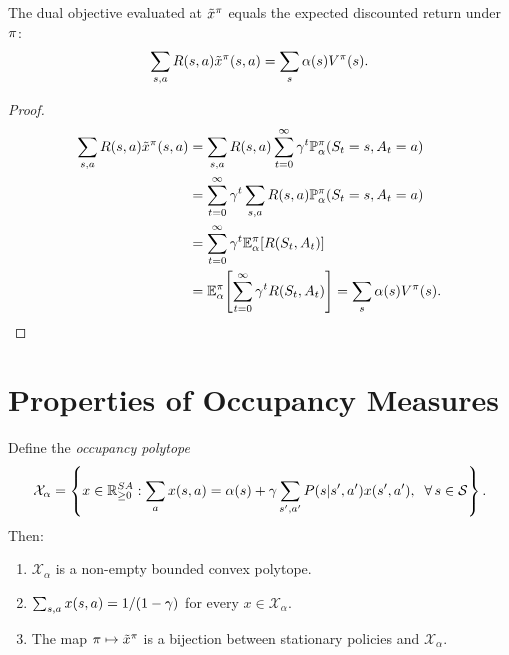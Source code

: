 \documentclass[11pt,a4paper]{article}
\begin{document}
\begin{proposition}
\label{prop:dual-value}
The dual objective evaluated at $\tilde{x}^\pi$ equals the
expected discounted return under $\pi$:
\[
    \sum_{s,a} R(s,a) \tilde{x}^\pi(s,a)
    = \sum_s \alpha(s) V^{\pi}(s).
\]
\end{proposition}

\begin{proof}
\begin{align*}
    \sum_{s,a} R(s,a) \tilde{x}^\pi(s,a)
    &= \sum_{s,a} R(s,a) \sum_{t=0}^\infty \gamma^t
    \mathbb{P}^\pi_\alpha(S_t = s, A_t = a) \\
    &= \sum_{t=0}^\infty \gamma^t \sum_{s,a} R(s,a)
    \mathbb{P}^\pi_\alpha(S_t = s, A_t = a) \\
    &= \sum_{t=0}^\infty \gamma^t
    \mathbb{E}^\pi_\alpha[R(S_t, A_t)] \\
    &= \mathbb{E}^\pi_\alpha\!\left[\sum_{t=0}^\infty
    \gamma^t R(S_t, A_t)\right]
    = \sum_s \alpha(s) V^{\pi}(s). \qedhere
\end{align*}
\end{proof}


\section{Properties of Occupancy Measures}
\label{sec:occupancy-properties}

\begin{theorem}
\label{thm:occupancy-polytope}
Define the \emph{occupancy polytope}
\begin{equation}
\label{eq:occupancy-set}
    \mathcal{X}_\alpha = \left\{ x \in \mathbb{R}^{SA}_{\geq 0} :
    \sum_a x(s,a) = \alpha(s) + \gamma \sum_{s',a'}
    P(s|s',a') x(s',a'), \;\; \forall\, s \in \mathcal{S} \right\}.
\end{equation}
Then:
\begin{enumerate}
    \item $\mathcal{X}_\alpha$ is a non-empty bounded convex
    polytope.
    \item $\sum_{s,a} x(s,a) = 1/(1-\gamma)$ for every
    $x \in \mathcal{X}_\alpha$.
    \item The map $\pi \mapsto \tilde{x}^\pi$ is a
    bijection between stationary policies and $\mathcal{X}_\alpha$.
\end{enumerate}
\end{theorem}
\end{document}
